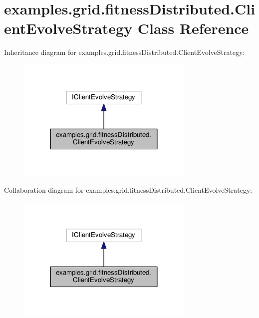 \hypertarget{classexamples_1_1grid_1_1fitness_distributed_1_1_client_evolve_strategy}{\section{examples.\-grid.\-fitness\-Distributed.\-Client\-Evolve\-Strategy Class Reference}
\label{classexamples_1_1grid_1_1fitness_distributed_1_1_client_evolve_strategy}
}


Inheritance diagram for examples.\-grid.\-fitness\-Distributed.\-Client\-Evolve\-Strategy\-:
\nopagebreak
\begin{figure}[H]
\begin{center}
\leavevmode
\includegraphics[width=240pt]{classexamples_1_1grid_1_1fitness_distributed_1_1_client_evolve_strategy__inherit__graph}
\end{center}
\end{figure}


Collaboration diagram for examples.\-grid.\-fitness\-Distributed.\-Client\-Evolve\-Strategy\-:
\nopagebreak
\begin{figure}[H]
\begin{center}
\leavevmode
\includegraphics[width=240pt]{classexamples_1_1grid_1_1fitness_distributed_1_1_client_evolve_strategy__coll__graph}
\end{center}
\end{figure}
